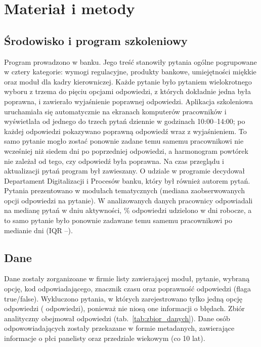 \section{Materiał i metody}

\subsection{Środowisko i program szkoleniowy}
Program prowadzono w banku. Jego treść stanowiły pytania ogólne pogrupowane w cztery kategorie:
wymogi regulacyjne, produkty bankowe, umiejętności miękkie oraz moduł dla kadry kierowniczej.
Każde pytanie było pytaniem wielokrotnego wyboru z trzema do pięciu opcjami odpowiedzi, z których
dokładnie jedna była poprawna, i zawierało wyjaśnienie poprawnej odpowiedzi. Aplikacja szkoleniowa
uruchamiała się automatycznie na ekranach komputerów pracowników i wyświetlała od jednego do trzech
pytań dziennie w godzinach 10:00--14:00; po każdej odpowiedzi pokazywano poprawną odpowiedź wraz
z wyjaśnieniem. To samo pytanie mogło zostać ponownie zadane temu samemu pracownikowi nie wcześniej
niż siedem dni po poprzedniej odpowiedzi, a harmonogram powtórek nie zależał od tego, czy odpowiedź
była poprawna. Na czas przeglądu i aktualizacji pytań program był zawieszany.
O udziale w programie decydował Departament Digitalizacji i Procesów banku, który był również autorem
pytań. Pytania prezentowano w modułach tematycznych (mediana \OptionsMedian{} zaobserwowanych opcji
odpowiedzi na pytanie). W analizowanych danych pracownicy odpowiadali na medianę \DailyMedian{}
pytań w dniu aktywności, \WeekdayPct\% odpowiedzi udzielono w dni robocze, a to samo pytanie było
ponownie zadawane temu samemu pracownikowi po medianie \GapMedian{} dni
(IQR \GapQOne--\GapQThree).

\subsection{Dane}
Dane zostały zorganizoane w firmie listy zawierającej  moduł, pytanie, wybraną opcję,
kod odpowiadającego, znacznik czasu oraz poprawność odpowiedzi (flaga true/false). Wykluczono  \NExcludedItems{} pytania, w których zarejestrowano
tylko jedną opcję odpowiedzi (\NExcludedItemResp{} odpowiedzi), ponieważ nie niosą one informacji
o błędach. Zbiór analityczny obejmował \NResponses{} odpowiedzi (tab.~\ref{tab:zbior_danych}).
Dane osób odpowowiadających zostały przekazane w formie metadanych, zawierające informacje o płci panelisty oraz przedziale wiekowym (co 10 lat).

